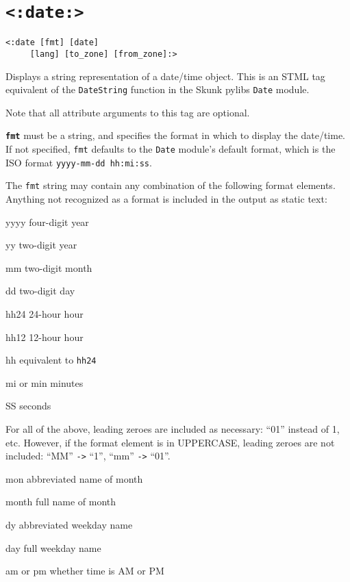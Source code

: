 \documentclass{manual}
\begin{document}
\section{\texttt{<:date:>}}
\label{tagdate}

\begin{verbatim}
<:date [fmt] [date] 
     [lang] [to_zone] [from_zone]:>
\end{verbatim}


Displays a string representation of a date/time object. This is 
an STML tag equivalent of the \texttt{DateString} function
in the Skunk pylibs \texttt{Date} module.

Note that all attribute arguments to this tag are optional.

\texttt{\textbf{fmt}} must be a string, and specifies the format in 
which to display the date/time. If not specified, \texttt{fmt} defaults to
the \texttt{Date} module's default format, which is the ISO format
\texttt{yyyy-mm-dd hh:mi:ss}.

    The \texttt{fmt} string may contain any combination of the 
    following format elements. Anything not recognized 
    as a format is included in the output as static text:

\begin{argdesc}
\item[yyyy] four-digit year
\item[yy] two-digit year
\item[mm] two-digit month
\item[dd] two-digit day
\item[hh24] 24-hour hour
\item[hh12] 12-hour hour
\item[hh] equivalent to \texttt{hh24}
\item[mi] or min minutes
\item[SS] seconds
\end{argdesc}

    For all of the above, leading zeroes are included 
    as necessary: ``01'' instead of 1, etc. However, 
    if the format element is in UPPERCASE, leading zeroes 
    are not included: ``MM'' \texttt{->} ``1'', ``mm'' \texttt{->} ``01''.

\begin{argdesc}
\item[mon] abbreviated name of month
\item[month] full name of month
\item[dy] abbreviated weekday name
\item[day] full weekday name
\item[am or pm] whether time is AM or PM
\end{argdesc}
\end{document}
